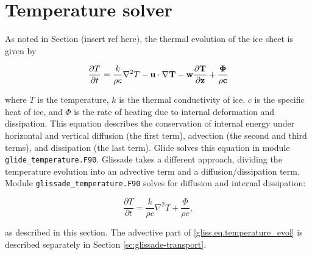 
\section{Temperature solver}
\label{sc:glissade-temperature}

As noted in Section (insert ref here), the thermal evolution of the ice sheet is given by

\begin{equation}
  \label{gliss.eq.temperature_evol}
  \frac{\partial T}{\partial t} = 
  \frac{k}{\rho c} {{\nabla }^{2}}T - \bf{u}\cdot \nabla T - w\frac{\partial T}{\partial z} + \frac{\Phi }{\rho c}
\end{equation}

\noindent
where $T$ is the temperature, $k$ is the thermal conductivity of ice, $c$ is the specific heat of ice,
and $\Phi$ is the rate of heating due to internal deformation and dissipation.
This equation describes the conservation of internal energy under horizontal and vertical 
diffusion (the first term), advection (the second and third terms), and dissipation
(the last term).
Glide solves this equation in module {\tt glide\_temperature.F90}.
Glissade takes a different approach, dividing the temperature evolution into an advective term
and a diffusion/dissipation term.
Module {\tt glissade\_temperature.F90} solves for diffusion and internal dissipation:

\begin{equation}
  \frac{\partial T}{\partial t} = \frac{k}{\rho c}{{\nabla }^{2}}T + \frac{\Phi }{\rho c},
\end{equation}

\noindent
as described in this section.
The advective part of \eqref{gliss.eq.temperature_evol} is described separately
in Section \ref{sc:glissade-transport}.

